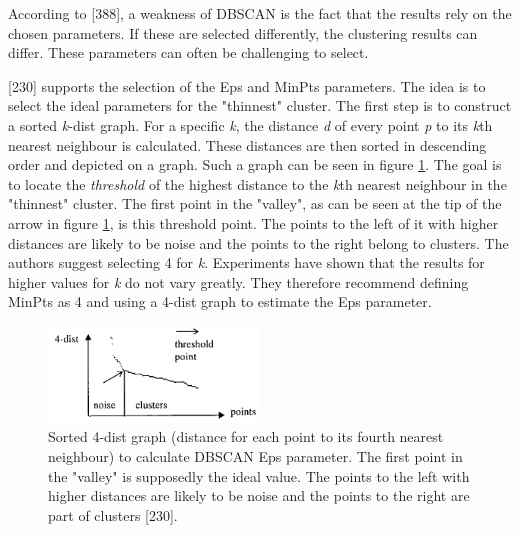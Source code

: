 According to \textcite{han2011data}[388], a weakness of DBSCAN is the fact that the results rely on the chosen parameters. If these are selected differently, the clustering results can differ. These parameters can often be challenging to select.


\textcite{DBSCAN}[230] supports the selection of the Eps and MinPts parameters. The idea is to select the ideal parameters for the "thinnest" cluster. The first step is to construct a sorted \textit{k}-dist graph. For a specific \textit{k}, the distance \textit{d} of every point \textit{p} to its \textit{k}th nearest neighbour is calculated. These distances are then sorted in descending order and depicted on a graph. Such a graph can be seen in figure \ref{figure:sortedKGraphDBSCAN}. The goal is to locate the \textit{threshold} of the highest distance to the \textit{k}th nearest neighbour in the "thinnest" cluster. The first point in the "valley", as can be seen at the tip of the arrow in figure \ref{figure:sortedKGraphDBSCAN}, is this threshold point. The points to the left of it with higher distances are likely to be noise and the points to the right belong to clusters. The authors suggest selecting 4 for \textit{k}. Experiments have shown that the results for higher values for \textit{k} do not vary greatly. They therefore recommend defining MinPts as 4 and using a 4-dist graph to estimate the Eps parameter.


\begin{figure}[h]
  \centering
  \includegraphics[width=0.5\textwidth]{./images/sortedKGraphDBSCAN.png}
  \caption{Sorted 4-dist graph (distance for each point to its fourth nearest neighbour) to calculate DBSCAN Eps parameter. The first point in the "valley" is supposedly the ideal value. The points to the left with higher distances are likely to be noise and the points to the right are part of clusters \autocite{DBSCAN}[230].}
  \label{figure:sortedKGraphDBSCAN}
\end{figure}


